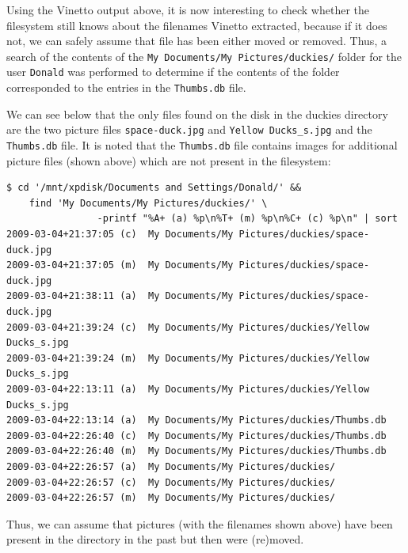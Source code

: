 \documentclass[a4paper,
    11pt,
    normalheadings,
    parindent,
    UKenglish,
    abstracton,
    ]{scrartcl}
\begin{document}
Using the Vinetto output above, it is now interesting to check whether the filesystem still knows about the filenames Vinetto extracted, because if it does not, we can safely assume that file has been either moved or removed.
Thus, a search of the contents of the {\tt My Documents/My Pictures/duckies/} folder for the user {\tt Donald} was performed to determine if the contents of the folder corresponded to the entries in the \texttt{Thumbs.db} file.

We can see below that the only files found on the disk in the duckies directory are the two picture files \texttt{space-duck.jpg} and \texttt{Yellow Ducks\_s.jpg} and the \texttt{Thumbs.db} file.
It is noted that the \texttt{Thumbs.db} file contains images for additional picture files (shown above) which are not present in the filesystem:
\begin{verbatim}
$ cd '/mnt/xpdisk/Documents and Settings/Donald/' &&
    find 'My Documents/My Pictures/duckies/' \
                -printf "%A+ (a) %p\n%T+ (m) %p\n%C+ (c) %p\n" | sort
2009-03-04+21:37:05 (c)  My Documents/My Pictures/duckies/space-duck.jpg
2009-03-04+21:37:05 (m)  My Documents/My Pictures/duckies/space-duck.jpg
2009-03-04+21:38:11 (a)  My Documents/My Pictures/duckies/space-duck.jpg
2009-03-04+21:39:24 (c)  My Documents/My Pictures/duckies/Yellow Ducks_s.jpg
2009-03-04+21:39:24 (m)  My Documents/My Pictures/duckies/Yellow Ducks_s.jpg
2009-03-04+22:13:11 (a)  My Documents/My Pictures/duckies/Yellow Ducks_s.jpg
2009-03-04+22:13:14 (a)  My Documents/My Pictures/duckies/Thumbs.db
2009-03-04+22:26:40 (c)  My Documents/My Pictures/duckies/Thumbs.db
2009-03-04+22:26:40 (m)  My Documents/My Pictures/duckies/Thumbs.db
2009-03-04+22:26:57 (a)  My Documents/My Pictures/duckies/
2009-03-04+22:26:57 (c)  My Documents/My Pictures/duckies/
2009-03-04+22:26:57 (m)  My Documents/My Pictures/duckies/
\end{verbatim}

Thus, we can assume that pictures (with the filenames shown above) have been present in the directory in the past but then were (re)moved.
\end{document}
